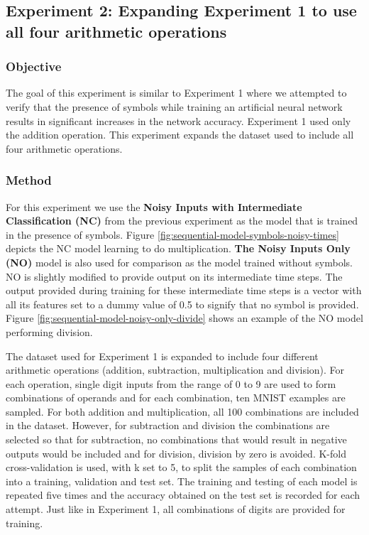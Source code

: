 \subsection{Experiment 2: Expanding Experiment 1 to use all four arithmetic operations} \label{sec:experiment-2}

\subsubsection{Objective}

The goal of this experiment is similar to Experiment 1 where we attempted to verify that the presence of symbols while training an artificial neural network results in significant increases in the network accuracy. Experiment 1 used only the addition operation. This experiment expands the dataset used to include all four arithmetic operations.

\subsubsection{Method}

For this experiment we use the \textbf{Noisy Inputs with Intermediate Classification (NC)} from the previous experiment as the model that is trained in the presence of symbols. Figure \ref{fig:sequential-model-symbols-noisy-times} depicts the NC model learning to do multiplication. \textbf{The Noisy Inputs Only (NO)} model is also used for comparison as the model trained without symbols. NO is slightly modified to provide output on its intermediate time steps. The output provided during training for these intermediate time steps is a vector with all its features set to a dummy value of 0.5 to signify that no symbol is provided. Figure \ref{fig:sequential-model-noisy-only-divide} shows an example of the NO model performing division.

The dataset used for Experiment 1 is expanded to include four different arithmetic operations (addition, subtraction, multiplication and division). For each operation, single digit inputs from the range of 0 to 9 are used to form combinations of operands and for each combination, ten MNIST examples are sampled. For both addition and multiplication, all 100 combinations are included in the dataset. However, for subtraction and division the combinations are selected so that for subtraction, no combinations that would result in negative outputs would be included and for division, division by zero is avoided. K-fold cross-validation is used, with k set to 5, to split the samples of each combination into a training, validation and test set. The training and testing of each model is repeated five times and the accuracy obtained on the test set is recorded for each attempt. Just like in Experiment 1, all combinations of digits are provided for training.

